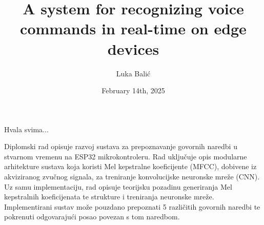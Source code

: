 \documentclass[diplomskirad]{fer}
\title{A system for recognizing voice commands in real-time on edge devices}
\author{Luka Balić}
\date{February 14th, 2025}
\begin{document}
\maketitle






\begin{zahvale}
  Hvala svima...
\end{zahvale}


\mainmatter


\tableofcontents

%








\begingroup
\small

\endgroup



\begin{sazetak}
  Diplomski rad opisuje razvoj sustava za prepoznavanje govornih naredbi u
  stvarnom vremenu na ESP32 mikrokontroleru. 
  Rad uključuje opis modularne arhitekture sustava koja koristi
  Mel kepstralne koeficijente (MFCC), dobivene iz akviziranog zvučnog signala,
  za treniranje konvolucijske neuronske mreže (CNN). Uz samu implementaciju,
  rad opisuje teorijsku pozadinu generiranja Mel kepstralnih koeficijenata te strukture
  i treniranja neuronske mreže. Implementirani sustav može pouzdano prepoznati 5 različitih
  govornih naredbi te pokrenuti odgovarajući posao povezan s tom naredbom.
\end{sazetak}
\end{document}
